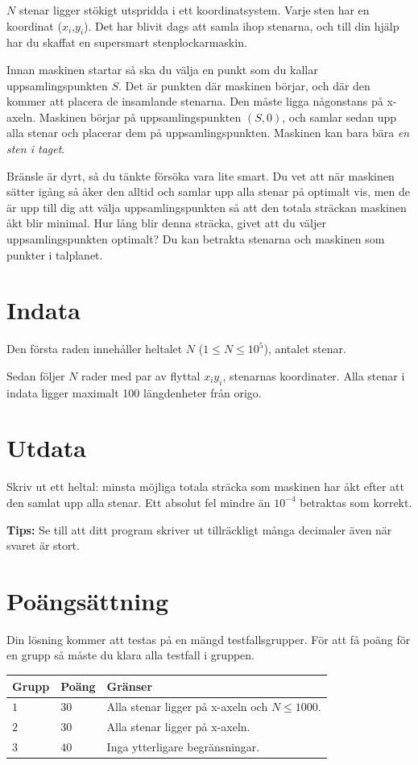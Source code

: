 
$N$ stenar ligger stökigt utspridda i ett koordinatsystem. Varje sten har en koordinat ($x_i$,$y_i$). Det har blivit dags att samla ihop stenarna, och till din hjälp har du skaffat en supersmart stenplockarmaskin.

Innan maskinen startar så ska du välja en punkt som du kallar uppsamlingspunkten $S$. Det är punkten där maskinen börjar, och där den kommer att placera de insamlande stenarna. Den måste ligga någonstans på x-axeln. Maskinen börjar på uppsamlingspunkten $(S,0)$, och samlar sedan upp alla stenar och placerar dem på uppsamlingspunkten. Maskinen kan bara bära \emph{en sten i taget}.

Bränsle är dyrt, så du tänkte försöka vara lite smart. Du vet att när maskinen sätter igång så åker den alltid och samlar upp alla stenar på optimalt vis, men de är upp till dig att välja uppsamlingspunkten så att den totala sträckan maskinen åkt blir minimal. Hur lång blir denna sträcka, givet att du väljer uppsamlingspunkten optimalt? Du kan betrakta stenarna och maskinen som punkter i talplanet.

\section*{Indata}
Den första raden innehåller heltalet $N$ ($1 \leq N \leq 10^5$), antalet stenar.

Sedan följer $N$ rader med par av flyttal $x_i y_i$, stenarnas koordinater. Alla stenar i
indata ligger maximalt 100 längdenheter från origo.

\section*{Utdata}
Skriv ut ett heltal: minsta möjliga totala sträcka som maskinen har åkt efter att den samlat upp alla stenar. Ett absolut fel mindre än $10^{-4}$ betraktas som korrekt.

{\bf Tips:} Se till att ditt program skriver ut tillräckligt många decimaler även när svaret är stort.

\section*{Poängsättning}
Din lösning kommer att testas på en mängd testfallsgrupper.
För att få poäng för en grupp så måste du klara alla testfall i gruppen.

\noindent
\begin{tabular}{| l | l | p{12cm} |}
  \hline
  \textbf{Grupp} & \textbf{Poäng} & \textbf{Gränser} \\ \hline
  $1$    & $30$       & Alla stenar ligger på x-axeln och $N \leq 1000$. \\ \hline
  $2$    & $30$       & Alla stenar ligger på x-axeln. \\ \hline
  $3$    & $40$       & Inga ytterligare begränsningar. \\ \hline
\end{tabular}


